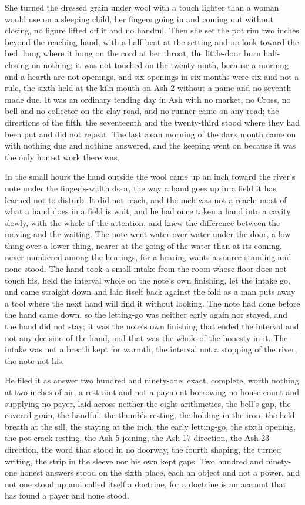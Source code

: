 She turned the dressed grain under wool with a touch lighter than a woman would use on a sleeping child, her fingers going in and coming out without closing, no figure lifted off it and no handful. Then she set the pot rim two inches beyond the reaching hand, with a half-beat at the setting and no look toward the bed.  hung where it hung on the cord at her throat, the little-door burn half-closing on nothing; it was not touched on the twenty-ninth, because a morning and a hearth are not openings, and six openings in six months were six and not a rule, the sixth held at the kiln mouth on Ash 2 without a name and no seventh made due. It was an ordinary tending day in Ash with no market, no Cross, no bell and no collector on the clay road, and no runner came on any road; the directions of the fifth, the seventeenth and the twenty-third stood where they had been put and did not repeat. The last clean morning of the dark month came on with nothing due and nothing answered, and the keeping went on because it was the only honest work there was.

In the small hours the hand outside the wool came up an inch toward the river's note under the finger's-width door, the way a hand goes up in a field it has learned not to disturb. It did not reach, and the inch was not a reach; most of what a hand does in a field is wait, and he had once taken a hand into a cavity slowly, with the whole of the attention, and knew the difference between the moving and the waiting. The note went water over water under the door, a low thing over a lower thing, nearer at the going of the water than at its coming, never numbered among the hearings, for a hearing wants a source standing and none stood. The hand took a small intake from the room whose floor does not touch his, held the interval whole on the note's own finishing, let the intake go, and came straight down and laid itself back against the fold as a man puts away a tool where the next hand will find it without looking. The note had done before the hand came down, so the letting-go was neither early again nor stayed, and the hand did not stay; it was the note's own finishing that ended the interval and not any decision of the hand, and that was the whole of the honesty in it. The intake was not a breath kept for warmth, the interval not a stopping of the river, the note not his.

He filed it as answer two hundred and ninety-one: exact, complete, worth nothing at two inches of air, a restraint and not a payment borrowing no house count and supplying no payer, laid across neither the eight arithmetics, the bell's gap, the covered grain, the handful, the thumb's resting, the holding in the iron, the held breath at the sill, the staying at the inch, the early letting-go, the sixth opening, the pot-crack resting, the Ash 5 joining, the Ash 17 direction, the Ash 23 direction, the word that stood in no doorway, the fourth shaping, the turned writing, the strip in the sleeve nor his own kept gaps. Two hundred and ninety-one honest answers stood on the sixth place, each an object and not a power, and not one stood up and called itself a doctrine, for a doctrine is an account that has found a payer and none stood.

